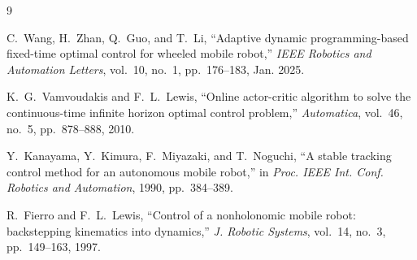 \documentclass[12pt,a4paper]{article}
\begin{document}
\begin{thebibliography}{9}

C.~Wang, H.~Zhan, Q.~Guo, and T.~Li,
``Adaptive dynamic programming-based fixed-time optimal control for wheeled mobile robot,''
\textit{IEEE Robotics and Automation Letters}, vol.~10, no.~1, pp.~176--183, Jan. 2025.

K.~G.~Vamvoudakis and F.~L.~Lewis,
``Online actor-critic algorithm to solve the continuous-time infinite horizon optimal control problem,''
\textit{Automatica}, vol.~46, no.~5, pp.~878--888, 2010.

Y.~Kanayama, Y.~Kimura, F.~Miyazaki, and T.~Noguchi,
``A stable tracking control method for an autonomous mobile robot,''
in \textit{Proc. IEEE Int. Conf. Robotics and Automation}, 1990, pp.~384--389.

R.~Fierro and F.~L.~Lewis,
``Control of a nonholonomic mobile robot: backstepping kinematics into dynamics,''
\textit{J. Robotic Systems}, vol.~14, no.~3, pp.~149--163, 1997.

\end{thebibliography}
\end{document}

